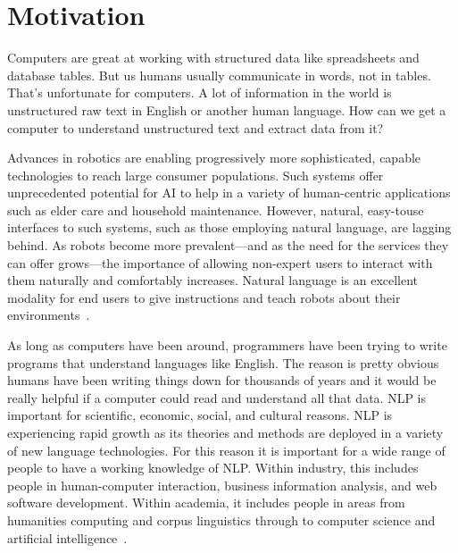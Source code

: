 \section{Motivation}
Computers are great at working with structured data like spreadsheets and database tables. But us humans usually communicate in words, not in tables. That’s unfortunate for computers. A lot of information in the world is unstructured raw text in English or another human language. How can we get a computer to understand unstructured text and extract data from it?

Advances in robotics are enabling progressively more sophisticated, capable technologies to reach large consumer populations. Such systems offer unprecedented potential for AI to help in a variety of human-centric applications such as elder care and household maintenance. However, natural, easy-touse interfaces to such systems, such as those employing natural language, are lagging behind. As robots become more prevalent—and as the need for the services they can offer grows—the importance of allowing non-expert users to interact with them naturally and comfortably increases. Natural language is an excellent modality for end users to give instructions and teach robots about their environments~\cite{ijcai2018-810}. 

As long as computers have been around, programmers have been trying to write programs that understand languages like English. The reason is pretty obvious humans have been writing things down for thousands of years and it would be really helpful if a computer could read and understand all that data. 
NLP is important for scientific, economic, social, and cultural reasons. NLP is experiencing rapid growth as its theories and methods are deployed in a variety of new language technologies. For this reason it is important for a wide range of people to have a working knowledge of NLP. Within industry, this includes people in human-computer interaction, business information analysis, and web software development. Within academia, it includes people in areas from humanities computing and corpus linguistics through to computer science and artificial intelligence~\cite{NLPbook}.

